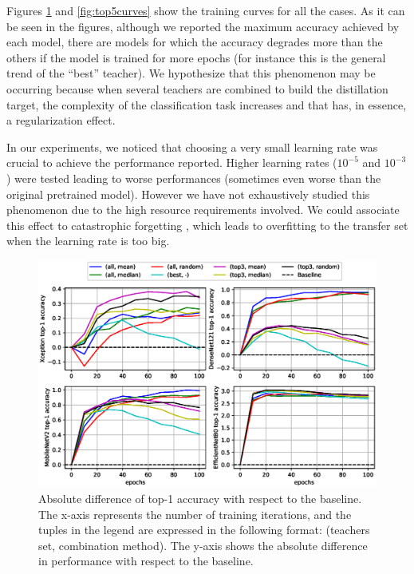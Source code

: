 \documentclass{elsarticle}
\begin{document}
	Figures \ref{fig:top1curves} and \ref{fig:top5curves} show the training curves for all the cases. As it can be seen in the figures, although we reported the maximum accuracy achieved by each model, there are models for which the accuracy degrades more than the others if the model is trained for more epochs (for instance this is the general trend of the ``best'' teacher). We hypothesize that this phenomenon may be occurring because when several teachers are combined to build the distillation target, the complexity of the classification task increases and that has, in essence, a regularization effect.
	
	In our experiments, we noticed that choosing a very small learning rate was crucial to achieve the performance reported. Higher learning rates ($10^{-5}$ and  $10^{-3}$) were tested leading to worse performances (sometimes even worse than the original pretrained model). However we have not exhaustively studied this phenomenon due to the high resource requirements involved. We could associate this effect to catastrophic forgetting \citep{French99}, which leads to overfitting to the transfer set when the learning rate is too big.
			
			
	\begin{figure}[h!]
		\centering
		\includegraphics[width=1\linewidth]{img/top1_curves}
		\caption{Absolute difference of top-1 accuracy with respect to the baseline. The x-axis represents the number of training iterations, and the tuples in the legend are expressed in the following format: (teachers set, combination method). The y-axis shows the absolute difference in performance with respect to the baseline.}
		\label{fig:top1curves}
	\end{figure}
	
\end{document}

